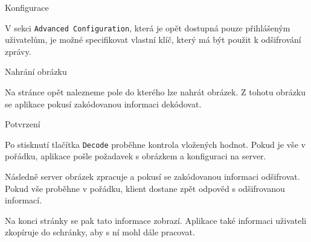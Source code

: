 \begin{subsubsection}{Konfigurace}\label{subsubsec:dec-konfigurace}

V sekci \texttt{Advanced Configuration}, která je opět dostupná pouze
přihlášeným uživatelům, je možné specifikovat vlastní klíč, který má být použit
k odšifrování zprávy.

\end{subsubsection}

\begin{subsubsection}{Nahrání obrázku}\label{subsubsec:dec-nahrani-obrazku}

Na stránce opět nalezneme pole do kterého lze nahrát obrázek.
Z tohotu obrázku se aplikace pokusí zakódovanou informaci dekódovat.

\end{subsubsection}

\begin{subsubsection}{Potvrzení}\label{subsubsec:dec-potvrzeni}

Po stisknutí tlačítka \texttt{Decode} proběhne kontrola vložených hodnot.
Pokud je vše v pořádku, aplikace pošle požadavek s obrázkem a konfiguraci na
server.

Následně server obrázek zpracuje a pokusí se zakódovanou informaci odšifrovat.
Pokud vše proběhne v pořádku, klient dostane zpět odpověd s odšifrovanou
informací.

Na konci stránky se pak tato informace zobrazí.
Aplikace také informaci uživateli zkopíruje do schránky, aby s ní mohl dále
pracovat.

\end{subsubsection}
